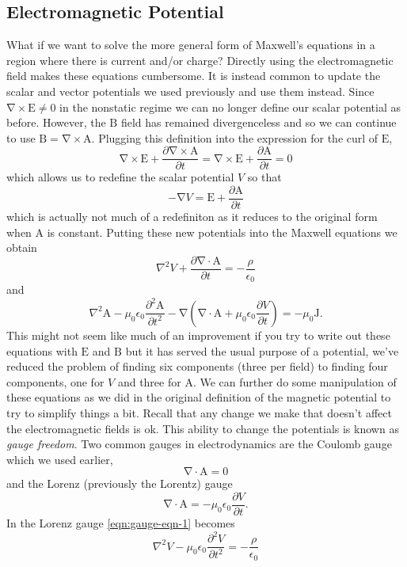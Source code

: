 \documentclass[10pt, twocolumn]{article}
\theoremstyle{definition}
\newcommand{\bv}[1]{\bm{\mathrm{#1}}}
\renewcommand{\div}[1]{\bv{\nabla}\cdot #1}
\renewcommand{\curl}[1]{\bv{\nabla}\times #1}
\begin{document}
\subsection{Electromagnetic Potential}
What if we want to solve the more general form of Maxwell's equations in a region where there is current and/or charge? Directly
using the electromagnetic field makes these equations cumbersome. It is instead common to update the scalar and vector potentials we used
previously and use them instead. Since $\curl{\bv{E}}\neq 0$ in the nonstatic regime we can no longer define our scalar potential as before.
However, the $\bv{B}$ field has remained divergenceless and so we can continue to use $\bv{B}=\curl{\bv{A}}$. Plugging this definition into
the expression for the curl of $\bv{E}$,
$$\curl{\bv{E}}+\frac{\partial \curl{\bv{A}}}{\partial t}=\curl{\bv{E}+\frac{\partial\bv{A}}{\partial t}}=0$$
which allows us to redefine the scalar potential $V$ so that
$$ -\bv{\nabla}V=\bv{E}+\frac{\partial\bv{A}}{\partial t}$$
which is actually not much of a redefiniton as it reduces to the original
form when $\bv{A}$ is constant. Putting these new potentials into the Maxwell equations we obtain
\begin{equation}
  \nabla^2 V + \frac{\partial \div{\bv{A}}}{\partial t}=-\frac{\rho}{\epsilon_0}
  \label{eqn:gauge-eqn-1}
\end{equation}
and
\begin{equation}
  \nabla^2\bv{A}-\mu_0\epsilon_0 \frac{\partial^2 \bv{A}}{\partial t^2}-\bv{\nabla}\left(\div{\bv{A}}+\mu_0\epsilon_0\frac{\partial V}{\partial t}\right)=-\mu_0\bv{J}.
  \label{eqn:gauge-eqn-2}
\end{equation}
This might not seem like much of an improvement if you try to write out these equations with $\bv{E}$ and $\bv{B}$ but it has served the usual purpose
of a potential, we've reduced the problem of finding six components (three per field) to finding four components, one for $V$ and three for $\bv{A}$.
We can further do some manipulation of these equations as we did in the original definition of the magnetic potential to try to simplify things a bit.
Recall that any change we make that doesn't affect the electromagnetic fields is ok. This ability to change the potentials is known as \emph{gauge freedom}.
Two common gauges in electrodynamics are the Coulomb gauge which we used earlier,
$$\div{\bv{A}}=0$$
and the Lorenz (previously the Lorentz) gauge
$$\div{\bv{A}}=-\mu_0\epsilon_0\frac{\partial V}{\partial t}.$$
In the Lorenz gauge \cref{eqn:gauge-eqn-1} becomes
\begin{equation}
  \nabla^2 V -\mu_0\epsilon_0 \frac{\partial ^2 V}{\partial t^2}=-\frac{\rho}{\epsilon_0}
  \label{eqn:scalar-wave}
\end{equation}
\end{document}
